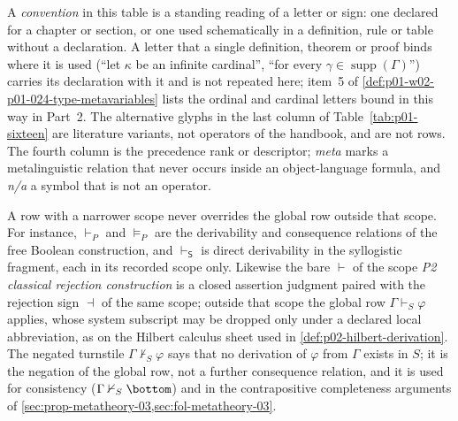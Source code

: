 A \emph{convention} in this table is a standing reading of a letter or
sign: one declared for a chapter or section, or one used schematically in a
definition, rule or table without a declaration.  A letter that a single
definition, theorem or proof binds where it is used (``let \(\kappa\) be an
infinite cardinal'', ``for every \(\gamma\in\operatorname{supp}(\Gamma)\)'')
carries its declaration with it and is not repeated here; item~5 of
\cref{def:p01-w02-p01-024-type-metavariables} lists the ordinal and
cardinal letters bound in this way in Part~2.  The alternative glyphs in the
last column of Table~\ref{tab:p01-sixteen} are literature variants, not
operators of the handbook, and are not rows.  The fourth column is the
precedence rank or descriptor; \emph{meta} marks a metalinguistic relation
that never occurs inside an object-language formula, and \emph{n/a} a
symbol that is not an operator.

A row with a narrower scope never overrides the global row outside that
scope.  For instance, \(\vdash_P\) and \(\models_P\) are the derivability and
consequence relations of the free Boolean construction, and
\(\vdash_{\mathsf S}\) is direct derivability in the syllogistic fragment,
each in its recorded scope only.  Likewise the bare \(\vdash\) of the scope
\emph{P2 classical rejection construction} is a closed assertion judgment
paired with the rejection sign \(\dashv\) of the same scope; outside that
scope the global row \(\Gamma\vdash_{S}\varphi\) applies, whose system
subscript may be dropped only under a declared local abbreviation, as on the
Hilbert calculus sheet used in \cref{def:p02-hilbert-derivation}.  The negated turnstile
\(\Gamma\nvdash_{S}\varphi\) says that no derivation of \(\varphi\) from
\(\Gamma\) exists in \(S\); it is the negation of the global row, not a
further consequence relation, and it is used for consistency
(\(\Gamma\nvdash_{S}\bottom\)) and in the contrapositive completeness
arguments of \cref{sec:prop-metatheory-03,sec:fol-metatheory-03}.

